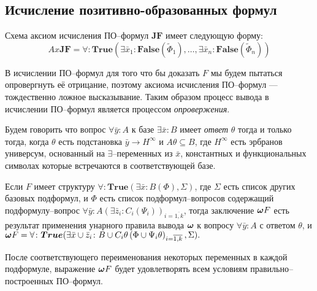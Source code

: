 \subsection{Исчисление позитивно-образованных формул}

Схема аксиом исчисления ПО--формул $\boldsymbol{JF}$ имеет следующую форму:
$$ Ax\boldsymbol{JF} = \forall\colon\boldsymbol{True}\left(\exists \bar{x}_1\colon\boldsymbol{False}\left(\widetilde{\Phi}_1\right),\ldots,\exists \bar{x}_n\colon\boldsymbol{False}\left(\widetilde{\Phi}_n\right)\right) $$

В исчислении ПО--формул для того что бы доказать $F$ мы будем пытаться опровергнуть её отрицание, поэтому аксиома исчисления ПО--формул ---  тождественно ложное высказывание. Таким образом процесс вывода в исчислении ПО--формул является процессом {\em опровержения}.

\begin{definition}
\label{ircond}
Будем говорить что вопрос $\forall \bar{y}\colon A$ к базе $\exists \bar{x}\colon B$ имеет {\em ответ} $\theta$  тогда и только тогда, когда $\theta$ есть подстановка $\bar{y} \rightarrow H^{\infty}$ и $A\theta \subseteq B$, где $H^{\infty}$ есть эрбранов универсум, основанный на $\exists$--переменных из $\bar{x}$, константных и функциональных символах которые встречаются в соответствующей базе.
\end{definition}


\begin{definition}
\label{omega}
Если $F$ имеет структуру $\forall\colon\boldsymbol{True}\left(\exists \bar{x}\colon B\left(\Phi\right),\Sigma\right)$, где $\Sigma$ есть список других базовых подформул, и $\Phi$ есть список подформул--вопросов содержащий подформулу--вопрос $\forall \bar{y}\colon A(\exists \bar{z}_i\colon C_i\left(\Psi_i\right))_{i=\overline{1,k}}$, тогда заключение $\boldsymbol{\omega} F$ есть результат применения унарного правила вывода $\boldsymbol{\omega}$ к вопросу $\forall \bar{y}\colon A$ с ответом $\theta$, и $\boldsymbol{\omega} F = \forall\colon\boldsymbol{True}(\exists \bar{x} \cup \bar{z}_i\colon B \cup C_i\theta\left(\Phi \cup \Psi_i\theta\right)_{i=\overline{1,k}},\Sigma).$

\end{definition}

После соответствующего переименования некоторых переменных в каждой подформуле, выражение $\boldsymbol{\omega} F$ будет удовлетворять всем условиям правильно--построенных ПО--формул.

